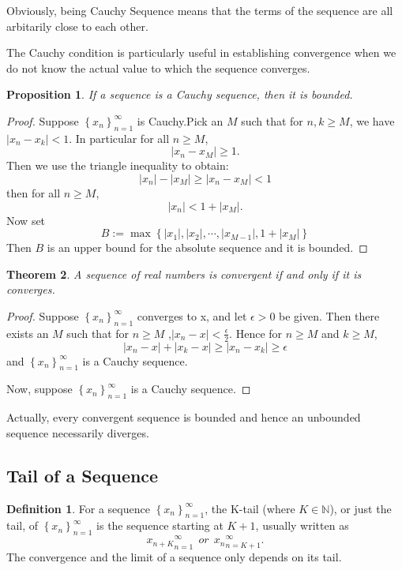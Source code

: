 \documentclass{article}
\newtheorem{theorem}{Theorem}[section]
\newtheorem{prop}[theorem]{Proposition}
\theoremstyle{definition}
\newtheorem{defi}{Definition}[section]
\begin{document}
Obviously, being Cauchy Sequence means that the terms 
of the sequence are all arbitarily close to each other.

The Cauchy condition is particularly useful in establishing 
convergence when we do not know the actual value to which 
the sequence converges.

\begin{prop}
If a sequence is a Cauchy sequence, then it is bounded.
\end{prop}

\begin{proof}
    Suppose $\left\{x_{n}\right\}_{n=1}^{\infty}$ is Cauchy.Pick an $M$ 
    such that for $n,k\geq M$, we have $|x_{n}-x_{k}|<1$. In particular 
    for all $n\geq M$, $$|x_{n}-x_{M}|\geq 1.$$
    Then we use the triangle inequality to obtain:
    $$|x_{n}|-|x_{M}|\geq |x_{n}-x_{M}| <1$$
    then for all $n\geq M$, $$|x_{n}|<1+|x_{M}|.$$
    Now set 
    $$B:=\max\left\{|x_{1}|,|x_{2}|,\cdots,|x_{M-1}|,1+|x_{M}|\right\}$$
    Then $B$ is an upper bound for the absolute sequence and it is bounded.
\end{proof}

\begin{theorem}
    A sequence of real numbers is convergent if and only if it is converges.
\end{theorem}

\begin{proof}
Suppose $\left\{x_{n}\right\}_{n=1}^{\infty}$ converges to x, and let $\epsilon>0$ be given. Then there exists 
an $M$ such that for $n\geq M$ ,$|x_{n}-x|<\frac{\epsilon}{2}.$
Hence for $n\geq M$ and $k\geq M$, 
$$|x_{n}-x|+|x_{k}-x|\geq |x_{n}-x_{k}| \geq \epsilon$$
and $\left\{x_{n}\right\}_{n=1}^{\infty}$ is a Cauchy sequence.

Now, suppose $\left\{x_{n}\right\}_{n=1}^{\infty}$ is a Cauchy sequence.
\end{proof}


Actually, every convergent sequence is bounded and hence an unbounded sequence necessarily diverges.


\subsection{Tail of a Sequence}

\begin{defi}
For a sequence $\left\{x_{n}\right\}_{n=1}^{\infty}$, the K-tail (where $K\in \mathbb{N}$), or just the tail, of $\left\{x_{n}\right\}_{n=1}^{\infty}$ is the sequence starting at $K+1$, usually written as 
$${x_{n+K}}_{n=1}^{\infty}\ \ or \ \ {x_{n}}_{n=K+1}^{\infty}.$$
The convergence and the limit of a sequence only depends on its tail.
\end{defi}
\end{document}

